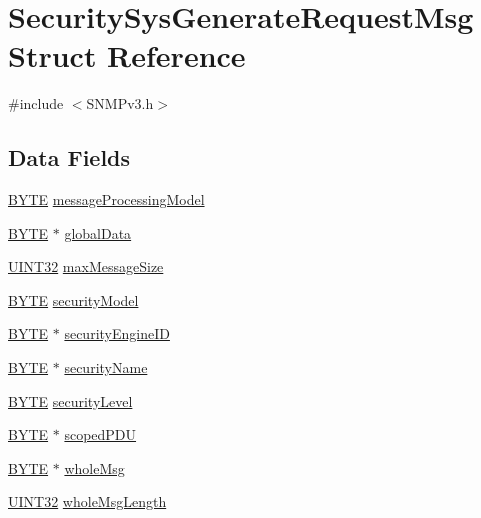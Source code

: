 \hypertarget{struct_security_sys_generate_request_msg}{}\section{Security\+Sys\+Generate\+Request\+Msg Struct Reference}
\label{struct_security_sys_generate_request_msg}


{\ttfamily \#include $<$S\+N\+M\+Pv3.\+h$>$}

\subsection*{Data Fields}
\begin{DoxyCompactItemize}
\item 
\hyperlink{_generic_type_defs_8h_a4ae1dab0fb4b072a66584546209e7d58}{B\+Y\+T\+E} \hyperlink{struct_security_sys_generate_request_msg_a47f1a1b8f7a3fe5623fe37df094ac032}{message\+Processing\+Model}
\item 
\hyperlink{_generic_type_defs_8h_a4ae1dab0fb4b072a66584546209e7d58}{B\+Y\+T\+E} $\ast$ \hyperlink{struct_security_sys_generate_request_msg_a5a2fea43d170690b7c0dd51c3486704e}{global\+Data}
\item 
\hyperlink{_generic_type_defs_8h_a1720f33f59b583f0c2ed071815623a86}{U\+I\+N\+T32} \hyperlink{struct_security_sys_generate_request_msg_a4bb188cbbe1cd83f7bba86b6ad7ab509}{max\+Message\+Size}
\item 
\hyperlink{_generic_type_defs_8h_a4ae1dab0fb4b072a66584546209e7d58}{B\+Y\+T\+E} \hyperlink{struct_security_sys_generate_request_msg_ac19ed44216346e9d6c50819813db6867}{security\+Model}
\item 
\hyperlink{_generic_type_defs_8h_a4ae1dab0fb4b072a66584546209e7d58}{B\+Y\+T\+E} $\ast$ \hyperlink{struct_security_sys_generate_request_msg_a51bb3d3b4289b68feb6ae97ffe038fc3}{security\+Engine\+I\+D}
\item 
\hyperlink{_generic_type_defs_8h_a4ae1dab0fb4b072a66584546209e7d58}{B\+Y\+T\+E} $\ast$ \hyperlink{struct_security_sys_generate_request_msg_a4a48a8746988a1f761c3e9eadcc20463}{security\+Name}
\item 
\hyperlink{_generic_type_defs_8h_a4ae1dab0fb4b072a66584546209e7d58}{B\+Y\+T\+E} \hyperlink{struct_security_sys_generate_request_msg_a9314d7b462ce4cc59202ed48fcdd9945}{security\+Level}
\item 
\hyperlink{_generic_type_defs_8h_a4ae1dab0fb4b072a66584546209e7d58}{B\+Y\+T\+E} $\ast$ \hyperlink{struct_security_sys_generate_request_msg_ab8f251f6cafeb71d641a1019102bca43}{scoped\+P\+D\+U}
\item 
\hyperlink{_generic_type_defs_8h_a4ae1dab0fb4b072a66584546209e7d58}{B\+Y\+T\+E} $\ast$ \hyperlink{struct_security_sys_generate_request_msg_a004e34c44705bf128556c60cca7a6586}{whole\+Msg}
\item 
\hyperlink{_generic_type_defs_8h_a1720f33f59b583f0c2ed071815623a86}{U\+I\+N\+T32} \hyperlink{struct_security_sys_generate_request_msg_ae69530a979f1b7b71b437d128ffc63ff}{whole\+Msg\+Length}
\end{DoxyCompactItemize}


